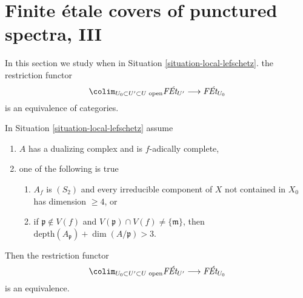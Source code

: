 \section{Finite \'etale covers of punctured spectra, III}
\label{section-pi1-punctured-spec-III}

\noindent
In this section we study when in Situation \ref{situation-local-lefschetz}.
the restriction functor
$$
\colim_{U_0 \subset U' \subset U\text{ open}} \textit{F\'Et}_{U'}
\longrightarrow
\textit{F\'Et}_{U_0}
$$
is an equivalence of categories.

\begin{lemma}
\label{lemma-essentially-surjective-general-better}
In Situation \ref{situation-local-lefschetz} assume
\begin{enumerate}
\item $A$ has a dualizing complex and is $f$-adically complete,
\item one of the following is true
\begin{enumerate}
\item $A_f$ is $(S_2)$ and every irreducible component of $X$
not contained in $X_0$ has dimension $\geq 4$, or
\item if $\mathfrak p \not \in V(f)$ and
$V(\mathfrak p) \cap V(f) \not = \{\mathfrak m\}$, then
$\text{depth}(A_\mathfrak p) + \dim(A/\mathfrak p) > 3$.
\end{enumerate}
\end{enumerate}
Then the restriction functor
$$
\colim_{U_0 \subset U' \subset U\text{ open}} \textit{F\'Et}_{U'}
\longrightarrow
\textit{F\'Et}_{U_0}
$$
is an equivalence.
\end{lemma}

